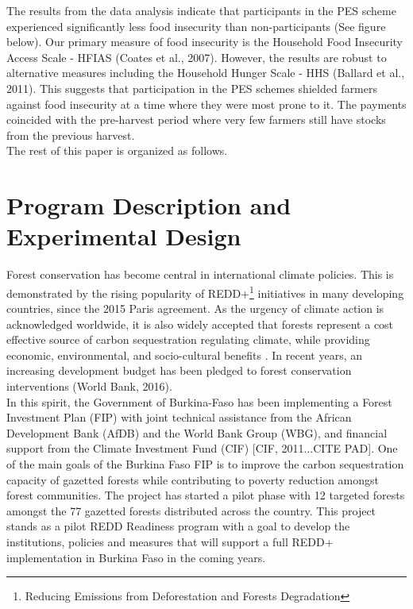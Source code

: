 \documentclass[preprint,12pt]{elsarticle}
\begin{document}
The results from the data analysis indicate that participants in the PES scheme experienced significantly less food insecurity than non-participants (See figure below). Our primary measure of food insecurity is the Household Food Insecurity Access Scale - HFIAS (Coates et al., 2007). However, the results are robust to alternative measures including the Household Hunger Scale - HHS (Ballard et al., 2011). This suggests that participation in the PES schemes shielded farmers against food insecurity at a time where they were most prone to it. The payments coincided with the pre-harvest period where very few farmers still have stocks from the previous harvest. \\

The rest of this paper is organized as follows. 
 






\newpage 
\section{Program Description and Experimental Design}

Forest conservation has become central in international climate policies. This is demonstrated by the rising popularity of REDD+\footnote{Reducing Emissions from Deforestation and Forests Degradation} initiatives in many developing countries, since the 2015 Paris agreement. As the urgency of climate action is acknowledged worldwide, it is also widely accepted that forests represent a cost effective source of carbon sequestration regulating climate, while providing economic, environmental, and socio-cultural benefits \citet{canadell2008managing}. In recent years, an increasing development budget has been pledged to forest conservation interventions (World Bank, 2016).  \\

In this spirit, the Government of Burkina-Faso has been implementing a Forest Investment Plan (FIP) with joint technical assistance from the African Development Bank (AfDB) and the World Bank Group (WBG), and financial support from the Climate Investment Fund (CIF) [CIF, 2011...CITE PAD]. One of the main goals of the Burkina Faso FIP is to improve the carbon sequestration capacity of gazetted forests while contributing to poverty reduction amongst forest communities. The project has started a pilot phase with 12 targeted forests amongst the 77 gazetted forests distributed across the country. This project stands as a pilot REDD Readiness program with a goal to develop the institutions, policies and measures that will support a full REDD+ implementation in Burkina Faso in the coming years. \\
\end{document}
